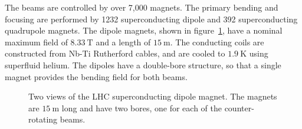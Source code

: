 The beams are controlled by over 7,000 magnets. The primary bending and focusing are performed by 1232 superconducting dipole and 392 superconducting quadrupole magnets. The dipole magnets, shown in figure~\ref{fig:LHC-dipole-magnets}, have a nominal maximum field of $\SI{8.33}{\tesla}$ and a length of $\SI{15}{\meter}$. The conducting coils are constructed from Nb-Ti Rutherford cables, and are cooled to $\SI{1.9}{\kelvin}$ using superfluid helium. The dipoles have a double-bore structure, so that a single magnet provides the bending field for both beams. 

\begin{figure}[htbp]
	\centering
	\hfill
	\caption{Two views of the LHC superconducting dipole magnet. The magnets are $\SI{15}{\meter}$ long and have two bores, one for each of the counter-rotating beams.}
	\label{fig:LHC-dipole-magnets}
\end{figure}


